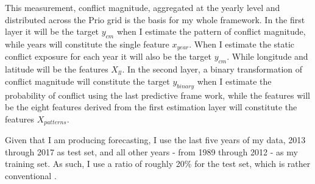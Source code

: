 \documentclass[a4paper]{article}
\begin{document}
This measurement, conflict magnitude, aggregated at the yearly level and distributed across the Prio grid is the basis for my whole framework. In the first layer it will be the target $y_{cm}$ when I estimate the pattern of conflict magnitude, while years will constitute the single feature $x_{year}$. When I estimate the static conflict exposure for each year it will also be the target $y_{cm}$. While longitude and latitude will be the features $X_{ll}$. In the second layer, a binary transformation of conflict magnitude will constitute the target $y_{binary}$ when I estimate the probability of conflict using the last predictive frame work, while the features will be the eight features derived from the first estimation layer will constitute the features $X_{patterns}$.\par

Given that I am producing forecasting, I use the last five years of my data, 2013 through 2017 as test set, and all other years - from 1989 through 2012 - as my training set. As such, I use a ratio of roughly 20\% for the test set, which is rather conventional \citep{Friedman_2001, Ward_Greenhill_Bakke_2010}.\par


\end{document}
